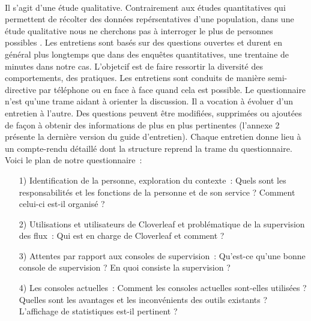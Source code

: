 			\paragraph{}%
			Il s'agit d'une étude qualitative. Contrairement aux études quantitatives qui
			permettent de récolter des données repérsentatives d'une population, dans une
			étude qualitative nous ne cherchons pas à interroger le plus de personnes
			possibles \citep{alami_les_2009}. Les entretiens sont basés sur des questions
			ouvertes et durent en général plus longtemps que dans des enquêtes quantitatives, une trentaine de
			minutes dans notre cas.
			L'objetcif est de faire ressortir la diversité des comportements, des
			pratiques.\newline
			Les entretiens sont conduits de manière semi-directive par téléphone ou en
			face à face quand cela est possible.
			Le questionnaire n'est qu'une trame aidant à orienter la discussion. Il a
			vocation à évoluer d’un entretien à l'autre. Des questions peuvent être
			modifiées, supprimées ou ajoutées de façon à obtenir des informations de plus en
			plus pertinentes (l'annexe 2 présente la dernière version du guide d'entretien).
			Chaque entretien donne lieu à un compte-rendu détaillé dont la structure reprend
			la trame du
			questionnaire.\newline
			Voici le plan de notre questionnaire~:
			\begin{itemize}
			  \item[1) Identification de la personne, exploration du contexte~:] Quels
			  sont les responsabilités et les fonctions de la personne et de son service
			  ? Comment celui-ci est-il organisé ?
			  \item[2) Utilisations et utilisateurs de Cloverleaf et problématique de la
			  supervision des flux~:] Qui est en charge de Cloverleaf et comment ?
			  \item[3) Attentes par rapport aux consoles de supervision~:] Qu'est-ce
			  qu'une bonne console de supervision ? En quoi consiste la supervision ?
			  \item[4) Les consoles actuelles~:] Comment les consoles actuelles
			  sont-elles utilisées ? Quelles sont les avantages et les inconvénients des
			  outils existants ? L'affichage de statistiques est-il pertinent ?
			\end{itemize}
			
